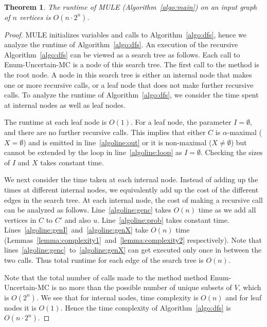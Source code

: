 \documentclass[11pt,letterpaper]{article}
\newtheorem{theorem}{Theorem}
\begin{document}
\begin{theorem}
\label{thm:complexity}
The runtime of MULE (Algorithm~\ref{algo:main}) on an input graph of $n$ vertices is $O\left (n \cdot 2^n \right)$.
\end{theorem}

\begin{proof}
MULE initializes variables and calls to Algorithm~\ref{algo:dfs}, hence we analyze the runtime of Algorithm~\ref{algo:dfs}. An execution of the recursive Algorithm~\ref{algo:dfs} can be viewed as a search tree as follows. Each call to Enum-Uncertain-MC is a node of this search tree. The first call to the method is the root node. A node in this search tree is either an internal node that makes one or more recursive calls, or a leaf node that does not make further recursive calls. To analyze the runtime of Algorithm~\ref{algo:dfs}, we consider the time spent at internal nodes as well as leaf nodes.

The runtime at each leaf node is $O(1)$. For a leaf node, the parameter $I = \emptyset$, and there are no further recursive calls. This implies that either $C$ is $\alpha$-maximal ($X = \emptyset$) and is emitted in line~\ref{algoline:out} or it is non-maximal ($X \neq \emptyset$) but cannot be extended by the loop in line~\ref{algoline:loop} as $I = \emptyset$. Checking the sizes of $I$ and $X$ takes constant time.

We next consider the time taken at each internal node. Instead of adding up the times at different internal nodes, we equivalently add up the cost of the different edges in the search tree. At each internal node, the cost of making a recursive call can be analyzed as follows. Line~\ref{algoline:genc} takes $O \left ( n \right )$ time as we add all vertices in $C$ to $C'$ and also $u$. Line~\ref{algoline:prob} takes constant time. Lines~\ref{algoline:genI}~and~\ref{algoline:genX} take $O \left ( n \right )$ time (Lemmas~\ref{lemma:complexity1}~and~\ref{lemma:complexity2} respectively). Note that lines~\ref{algoline:genc}~to~\ref{algoline:genX} can get executed only once in between the two calls. Thus total runtime for each edge of the search tree is $O\left ( n \right )$.

Note that the total number of calls made to the method method Enum-Uncertain-MC is no more than the possible number of unique subsets of $V$, which is  $O \left ( 2^n \right )$. We see that for internal nodes, time complexity is $O \left ( n \right )$ and for leaf nodes it is $O \left ( 1 \right )$. Hence the time complexity of Algorithm~\ref{algo:dfs} is $O \left ( n \cdot 2^n \right )$. 
\end{proof}
\end{document}
